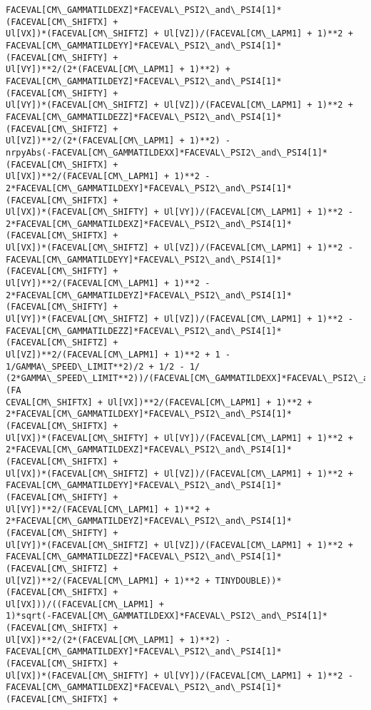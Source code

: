\documentclass[landscape,letterpaper,10pt,english]{article}
\begin{document}
\begin{Verbatim}[commandchars=\\\{\}]
FACEVAL[CM\_GAMMATILDEXZ]*FACEVAL\_PSI2\_and\_PSI4[1]*(FACEVAL[CM\_SHIFTX] +
Ul[VX])*(FACEVAL[CM\_SHIFTZ] + Ul[VZ])/(FACEVAL[CM\_LAPM1] + 1)**2 +
FACEVAL[CM\_GAMMATILDEYY]*FACEVAL\_PSI2\_and\_PSI4[1]*(FACEVAL[CM\_SHIFTY] +
Ul[VY])**2/(2*(FACEVAL[CM\_LAPM1] + 1)**2) +
FACEVAL[CM\_GAMMATILDEYZ]*FACEVAL\_PSI2\_and\_PSI4[1]*(FACEVAL[CM\_SHIFTY] +
Ul[VY])*(FACEVAL[CM\_SHIFTZ] + Ul[VZ])/(FACEVAL[CM\_LAPM1] + 1)**2 +
FACEVAL[CM\_GAMMATILDEZZ]*FACEVAL\_PSI2\_and\_PSI4[1]*(FACEVAL[CM\_SHIFTZ] +
Ul[VZ])**2/(2*(FACEVAL[CM\_LAPM1] + 1)**2) -
nrpyAbs(-FACEVAL[CM\_GAMMATILDEXX]*FACEVAL\_PSI2\_and\_PSI4[1]*(FACEVAL[CM\_SHIFTX] +
Ul[VX])**2/(FACEVAL[CM\_LAPM1] + 1)**2 -
2*FACEVAL[CM\_GAMMATILDEXY]*FACEVAL\_PSI2\_and\_PSI4[1]*(FACEVAL[CM\_SHIFTX] +
Ul[VX])*(FACEVAL[CM\_SHIFTY] + Ul[VY])/(FACEVAL[CM\_LAPM1] + 1)**2 -
2*FACEVAL[CM\_GAMMATILDEXZ]*FACEVAL\_PSI2\_and\_PSI4[1]*(FACEVAL[CM\_SHIFTX] +
Ul[VX])*(FACEVAL[CM\_SHIFTZ] + Ul[VZ])/(FACEVAL[CM\_LAPM1] + 1)**2 -
FACEVAL[CM\_GAMMATILDEYY]*FACEVAL\_PSI2\_and\_PSI4[1]*(FACEVAL[CM\_SHIFTY] +
Ul[VY])**2/(FACEVAL[CM\_LAPM1] + 1)**2 -
2*FACEVAL[CM\_GAMMATILDEYZ]*FACEVAL\_PSI2\_and\_PSI4[1]*(FACEVAL[CM\_SHIFTY] +
Ul[VY])*(FACEVAL[CM\_SHIFTZ] + Ul[VZ])/(FACEVAL[CM\_LAPM1] + 1)**2 -
FACEVAL[CM\_GAMMATILDEZZ]*FACEVAL\_PSI2\_and\_PSI4[1]*(FACEVAL[CM\_SHIFTZ] +
Ul[VZ])**2/(FACEVAL[CM\_LAPM1] + 1)**2 + 1 - 1/GAMMA\_SPEED\_LIMIT**2)/2 + 1/2 - 1/
(2*GAMMA\_SPEED\_LIMIT**2))/(FACEVAL[CM\_GAMMATILDEXX]*FACEVAL\_PSI2\_and\_PSI4[1]*(FA
CEVAL[CM\_SHIFTX] + Ul[VX])**2/(FACEVAL[CM\_LAPM1] + 1)**2 +
2*FACEVAL[CM\_GAMMATILDEXY]*FACEVAL\_PSI2\_and\_PSI4[1]*(FACEVAL[CM\_SHIFTX] +
Ul[VX])*(FACEVAL[CM\_SHIFTY] + Ul[VY])/(FACEVAL[CM\_LAPM1] + 1)**2 +
2*FACEVAL[CM\_GAMMATILDEXZ]*FACEVAL\_PSI2\_and\_PSI4[1]*(FACEVAL[CM\_SHIFTX] +
Ul[VX])*(FACEVAL[CM\_SHIFTZ] + Ul[VZ])/(FACEVAL[CM\_LAPM1] + 1)**2 +
FACEVAL[CM\_GAMMATILDEYY]*FACEVAL\_PSI2\_and\_PSI4[1]*(FACEVAL[CM\_SHIFTY] +
Ul[VY])**2/(FACEVAL[CM\_LAPM1] + 1)**2 +
2*FACEVAL[CM\_GAMMATILDEYZ]*FACEVAL\_PSI2\_and\_PSI4[1]*(FACEVAL[CM\_SHIFTY] +
Ul[VY])*(FACEVAL[CM\_SHIFTZ] + Ul[VZ])/(FACEVAL[CM\_LAPM1] + 1)**2 +
FACEVAL[CM\_GAMMATILDEZZ]*FACEVAL\_PSI2\_and\_PSI4[1]*(FACEVAL[CM\_SHIFTZ] +
Ul[VZ])**2/(FACEVAL[CM\_LAPM1] + 1)**2 + TINYDOUBLE))*(FACEVAL[CM\_SHIFTX] +
Ul[VX]))/((FACEVAL[CM\_LAPM1] +
1)*sqrt(-FACEVAL[CM\_GAMMATILDEXX]*FACEVAL\_PSI2\_and\_PSI4[1]*(FACEVAL[CM\_SHIFTX] +
Ul[VX])**2/(2*(FACEVAL[CM\_LAPM1] + 1)**2) -
FACEVAL[CM\_GAMMATILDEXY]*FACEVAL\_PSI2\_and\_PSI4[1]*(FACEVAL[CM\_SHIFTX] +
Ul[VX])*(FACEVAL[CM\_SHIFTY] + Ul[VY])/(FACEVAL[CM\_LAPM1] + 1)**2 -
FACEVAL[CM\_GAMMATILDEXZ]*FACEVAL\_PSI2\_and\_PSI4[1]*(FACEVAL[CM\_SHIFTX] +

\end{Verbatim}
\end{document}
